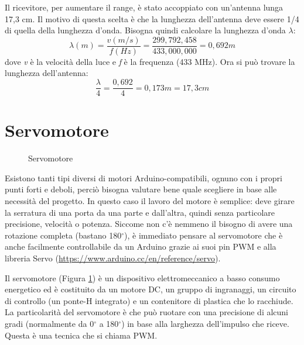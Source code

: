\documentclass[12pt]{report}
\begin{document}
Il ricevitore, per aumentare il range, è stato accoppiato con un'antenna lunga 17,3 cm. Il motivo di questa scelta è che la lunghezza dell'antenna deve essere 1/4 di quella della lunghezza d'onda. Bisogna quindi calcolare la lunghezza d'onda $\lambda$:
%
\[\lambda(m) = \frac{v(m/s)}{f(Hz)} = \frac{299,792,458}{433,000,000} = 0,692 m\] 
%
dove \textit{v} è la velocità della luce e \textit{f} è la frequenza (433 MHz). Ora si può trovare la lunghezza dell'antenna: 
%
\[\frac{\lambda}{4} = \frac{0,692}{4} = 0,173m = 17,3 cm \]
%

%
\section{Servomotore}\label{sec:servomotore}
%

\begin{figure}[H]
	\caption{Servomotore}
	\label{fig:servo}
\end{figure}
Esistono tanti tipi diversi di motori Arduino-compatibili, ognuno con i propri punti forti e deboli, perciò bisogna valutare bene quale scegliere in base alle necessità del progetto. In questo caso il lavoro del motore è semplice: deve girare la serratura di una porta da una parte e dall'altra, quindi senza particolare precisione, velocità o potenza. Siccome non c'è nemmeno il bisogno di avere una rotazione completa (bastano 180$^{\circ}$), è immediato pensare al servomotore che è anche facilmente controllabile da un Arduino grazie ai suoi pin PWM e alla libreria Servo (\url{https://www.arduino.cc/en/reference/servo}).

Il servomotore (Figura \ref{fig:servo}) è un dispositivo elettromeccanico a basso consumo energetico ed è costituito da un motore DC, un gruppo di ingranaggi, un circuito di controllo (un ponte-H integrato) e un contenitore di plastica che lo racchiude.
La particolarità del servomotore è che può ruotare con una precisione di alcuni gradi (normalmente da 0$^{\circ}$ a 180$^{\circ}$) in base alla larghezza dell'impulso che riceve. Questa è una tecnica che si chiama PWM.

\end{document}
